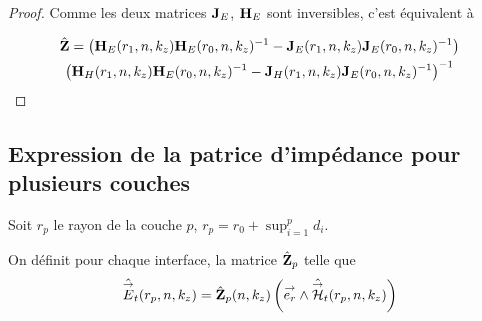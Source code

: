 \begin{proof}
      Comme les deux matrices \(\mJ_E\), \(\mH_E\) sont inversibles, c'est équivalent à

      \begin{multline}
        \hat \mZ =
        \left(\mH_{E}(r_1,n,k_z)\mH_{E}(r_0,n,k_z)^{-1} - \mJ_{E}(r_1,n,k_z)\mJ_{E}(r_0,n,k_z)^{-1}\right)
        \\
        \left(\mH_{H}(r_1,n,k_z)\mH_{E}(r_0,n,k_z)^{-1} - \mJ_{H}(r_1,n,k_z)\mJ_{E}(r_0,n,k_z)^{-1}\right)^{-1}
      \end{multline}

    \end{proof}


  \subsection{Expression de la patrice d'impédance pour plusieurs couches}

    \begin{figure}[!hbt]
      \centering
      \begin{tikzpicture}
        
      \end{tikzpicture}
    \end{figure}

    Soit \(r_p\) le rayon de la couche \(p\), \(r_p = r_0 +\sup_{i=1}^{p} d_{i}\).

    \begin{defn}
      On définit pour chaque interface, la matrice \(\hat \mZ_p\) telle que
      \begin{equation}
        \hat \vE_t(r_p,n,k_z) = \hat \mZ_p(n,k_z) \left(\vect{e_r} \pvect \hat \vH_t(r_p,n,k_z)\right)
      \end{equation}
    \end{defn}

